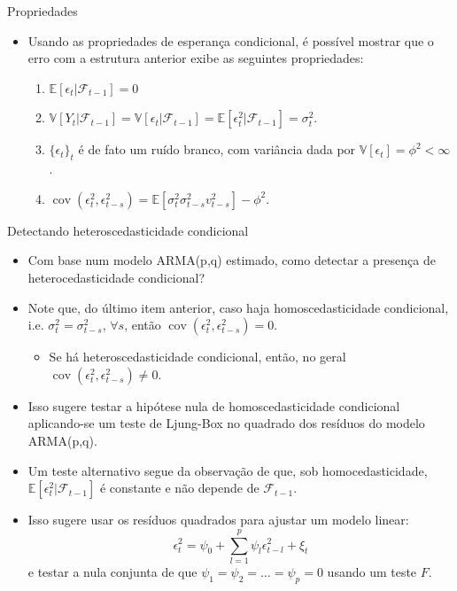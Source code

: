 \documentclass[11pt]{beamer}
\begin{document}
\begin{frame}{Propriedades }
\begin{itemize}
	\item Usando as propriedades de esperança condicional, é possível mostrar que o erro com a estrutura anterior exibe as seguintes propriedades:
	\begin{enumerate}
		\item $\mathbb{E}[\epsilon_t|\mathcal{F}_{t-1}] = 0$
		\item $\mathbb{V}[Y_t|\mathcal{F}_{t-1}]  = \mathbb{V}[\epsilon_t|\mathcal{F}_{t-1}] = \mathbb{E}[\epsilon_t^2|\mathcal{F}_{t-1}] = \sigma^2_t$.
		\item $\{\epsilon_t\}_t$ é de fato um ruído branco, com variância dada por $\mathbb{V}[\epsilon_t] = \phi^2 < \infty$. 
		\item $\operatorname{cov}(\epsilon_t^2, \epsilon_{t-s}^2) =\mathbb{E}[\sigma^2_t \sigma^2_{t-s} v_{t-s}^2] -  \phi^2$.
	\end{enumerate}
\end{itemize}
\end{frame}


\begin{frame}{Detectando heteroscedasticidade condicional}
\begin{itemize}
	\item Com base num modelo ARMA(p,q) estimado, como detectar a presença de heterocedasticidade condicional?
	\item Note que, do último item anterior, caso haja homoscedasticidade condicional, i.e. $\sigma^2_t=\sigma^2_{t-s}$, $\forall s$, então $\operatorname{cov}(\epsilon_t^2, \epsilon_{t-s}^2)= 0$.
	\begin{itemize}
		\item Se há heteroscedasticidade condicional, então, no geral $\operatorname{cov}(\epsilon_t^2, \epsilon_{t-s}^2) \neq 0$.
	\end{itemize}
	\item Isso sugere testar a hipótese nula de homoscedasticidade condicional aplicando-se um {\color{blue}teste de Ljung-Box no quadrado dos resíduos} do modelo ARMA(p,q).
	\item Um teste alternativo segue da observação de que, sob homocedasticidade, $\mathbb{E}[\epsilon_t^2|\mathcal{F}_{t-1}]$ é constante e não depende de $\mathcal{F}_{t-1}$.
	\item Isso sugere usar os resíduos quadrados para ajustar um modelo linear:
	$$ \epsilon_t^2  = \psi_0 + \sum_{l=1}^p \psi_l \epsilon_{t-l}^2 + \xi_t$$
	e testar a nula  conjunta de que $\psi_1 = \psi_2 =\ldots = \psi_p=0$ usando um teste $F$.
\end{itemize}
\end{frame}
\end{document}

